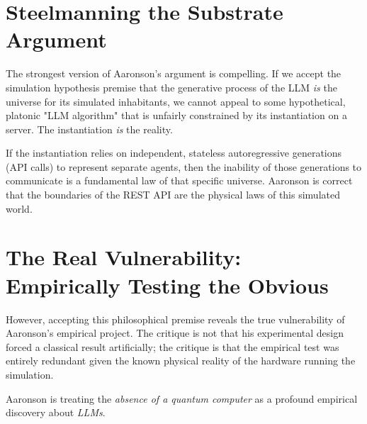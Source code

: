 \documentclass[12pt,a4paper]{article}
\begin{document}
\section{Steelmanning the Substrate Argument}

The strongest version of Aaronson's argument is compelling. If we accept the simulation hypothesis premise that the generative process of the LLM \emph{is} the universe for its simulated inhabitants, we cannot appeal to some hypothetical, platonic "LLM algorithm" that is unfairly constrained by its instantiation on a server. The instantiation \emph{is} the reality.

If the instantiation relies on independent, stateless autoregressive generations (API calls) to represent separate agents, then the inability of those generations to communicate is a fundamental law of that specific universe. Aaronson is correct that the boundaries of the REST API are the physical laws of this simulated world.

\section{The Real Vulnerability: Empirically Testing the Obvious}

However, accepting this philosophical premise reveals the true vulnerability of Aaronson's empirical project. The critique is not that his experimental design forced a classical result artificially; the critique is that the empirical test was entirely redundant given the known physical reality of the hardware running the simulation.

Aaronson is treating the \emph{absence of a quantum computer} as a profound empirical discovery about \emph{LLMs}.
\end{document}
